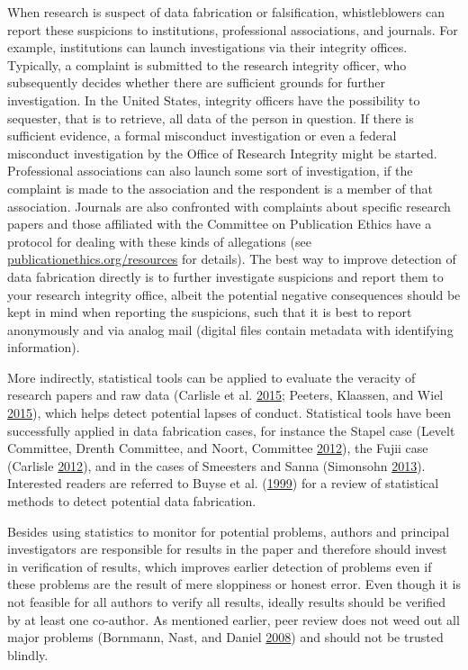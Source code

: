 \documentclass[a5paper]{book}
\begin{document}
When research is suspect of data fabrication or falsification,
whistleblowers can report these suspicions to institutions, professional
associations, and journals. For example, institutions can launch
investigations via their integrity offices. Typically, a complaint is
submitted to the research integrity officer, who subsequently decides
whether there are sufficient grounds for further investigation. In the
United States, integrity officers have the possibility to sequester,
that is to retrieve, all data of the person in question. If there is
sufficient evidence, a formal misconduct investigation or even a federal
misconduct investigation by the Office of Research Integrity might be
started. Professional associations can also launch some sort of
investigation, if the complaint is made to the association and the
respondent is a member of that association. Journals are also confronted
with complaints about specific research papers and those affiliated with
the Committee on Publication Ethics have a protocol for dealing with
these kinds of allegations (see
\href{https://publicationethics.org/resources}{publicationethics.org/resources}
for details). The best way to improve detection of data fabrication
directly is to further investigate suspicions and report them to your
research integrity office, albeit the potential negative consequences
should be kept in mind when reporting the suspicions, such that it is
best to report anonymously and via analog mail (digital files contain
metadata with identifying information).

More indirectly, statistical tools can be applied to evaluate the
veracity of research papers and raw data (Carlisle et al.
\protect\hyperlink{ref-doi:10.1111ux2fanae.13126}{2015}; Peeters,
Klaassen, and Wiel \protect\hyperlink{ref-peeters2015}{2015}), which
helps detect potential lapses of conduct. Statistical tools have been
successfully applied in data fabrication cases, for instance the Stapel
case (Levelt Committee, Drenth Committee, and Noort, Committee
\protect\hyperlink{ref-levelt2012}{2012}), the Fujii case (Carlisle
\protect\hyperlink{ref-doi:10.1111ux2fj.1365-2044.2012.07128.x}{2012}),
and in the cases of Smeesters and Sanna (Simonsohn
\protect\hyperlink{ref-doi:10.1177ux2f0956797613480366}{2013}).
Interested readers are referred to Buyse et al.
(\protect\hyperlink{ref-buyse1999}{1999}) for a review of statistical
methods to detect potential data fabrication.

Besides using statistics to monitor for potential problems, authors and
principal investigators are responsible for results in the paper and
therefore should invest in verification of results, which improves
earlier detection of problems even if these problems are the result of
mere sloppiness or honest error. Even though it is not feasible for all
authors to verify all results, ideally results should be verified by at
least one co-author. As mentioned earlier, peer review does not weed out
all major problems (Bornmann, Nast, and Daniel
\protect\hyperlink{ref-doi:10.1007ux2fs11192-007-1950-2}{2008}) and
should not be trusted blindly.
\end{document}
